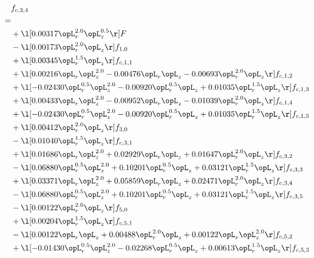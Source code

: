 \begin{alignat}{2} 
\label{eq:f_34_1} 
& f_{c,3,4} \nonumber \\ 
 = \\ 
& + \l[  0.00317 \opL_r^{2.0} \opL_z^{0.5}  \r] F \nonumber \\ 
& - \l[  0.00173 \opL_r^{2.0} \opL_z  \r] f_{1,0} \nonumber \\ 
& + \l[  0.00345 \opL_r^{1.5} \opL_z  \r] f_{c,1,1} \nonumber \\ 
& + \l[  0.00216 \opL_r \opL_z^{2.0}   -0.00476 \opL_r \opL_z   -0.00693 \opL_r^{2.0} \opL_z  \r] f_{c,1,2} \nonumber \\ 
& + \l[  -0.02430 \opL_r^{0.5} \opL_z^{2.0}   -0.00920 \opL_r^{0.5} \opL_z +  0.01035 \opL_r^{1.5} \opL_z  \r] f_{c,1,3} \nonumber \\ 
& + \l[  0.00433 \opL_r \opL_z^{2.0}   -0.00952 \opL_r \opL_z   -0.01039 \opL_r^{2.0} \opL_z  \r] f_{c,1,4} \nonumber \\ 
& + \l[  -0.02430 \opL_r^{0.5} \opL_z^{2.0}   -0.00920 \opL_r^{0.5} \opL_z +  0.01035 \opL_r^{1.5} \opL_z  \r] f_{c,1,5} \nonumber \\ 
& + \l[  0.00412 \opL_r^{2.0} \opL_z  \r] f_{3,0} \nonumber \\ 
& - \l[  0.01040 \opL_r^{1.5} \opL_z  \r] f_{c,3,1} \nonumber \\ 
& + \l[  0.01686 \opL_r \opL_z^{2.0} +  0.02929 \opL_r \opL_z +  0.01647 \opL_r^{2.0} \opL_z  \r] f_{c,3,2} \nonumber \\ 
& - \l[  0.06880 \opL_r^{0.5} \opL_z^{2.0} +  0.10201 \opL_r^{0.5} \opL_z +  0.03121 \opL_r^{1.5} \opL_z  \r] f_{c,3,3} \nonumber \\ 
& + \l[  0.03371 \opL_r \opL_z^{2.0} +  0.05859 \opL_r \opL_z +  0.02471 \opL_r^{2.0} \opL_z  \r] f_{c,3,4} \nonumber \\ 
& - \l[  0.06880 \opL_r^{0.5} \opL_z^{2.0} +  0.10201 \opL_r^{0.5} \opL_z +  0.03121 \opL_r^{1.5} \opL_z  \r] f_{c,3,5} \nonumber \\ 
& - \l[  0.00122 \opL_r^{2.0} \opL_z  \r] f_{5,0} \nonumber \\ 
& + \l[  0.00204 \opL_r^{1.5} \opL_z  \r] f_{c,5,1} \nonumber \\ 
& - \l[  0.00122 \opL_r \opL_z +  0.00488 \opL_r^{2.0} \opL_z +  0.00122 \opL_r \opL_z^{2.0}  \r] f_{c,5,2} \nonumber \\ 
& + \l[  -0.01430 \opL_r^{0.5} \opL_z^{2.0}   -0.02268 \opL_r^{0.5} \opL_z +  0.00613 \opL_r^{1.5} \opL_z  \r] f_{c,5,3} \nonumber \\ 

\end{alignat}
